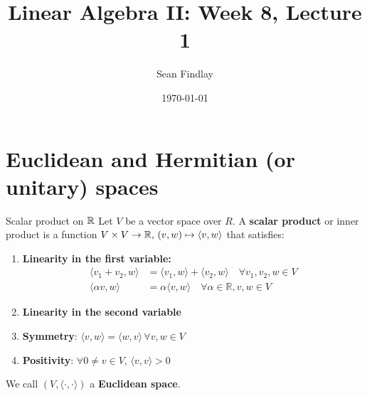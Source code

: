 \documentclass[12pt]{article}
\title{Linear Algebra II: Week 8, Lecture 1}
\author{Sean Findlay}
\date{\today}
\begin{document}
\maketitle

\section{Euclidean and Hermitian (or unitary) spaces}

\begin{definition}{Scalar product on $\mathbb{R}$}{}
Let $V$ be a vector space over $R$. A \textbf{scalar product} or inner product is a function $V \times V \rightarrow \mathbb{R}, \, (v, w) \mapsto \langle v, w \rangle$ that satisfies:

\begin{enumerate}
    \item \textbf{Linearity in the first variable:}
    \begin{align*}
        \langle v_1 + v_2, w \rangle &= \langle v_1, w \rangle + \langle v_2, w \rangle \quad \forall v_1, v_2, w \in V \\
        \langle \alpha v, w \rangle &= \alpha \langle v, w \rangle \quad \forall \alpha \in \mathbb{R}, v, w \in V
    \end{align*}

    \item \textbf{Linearity in the second variable}
    \item \textbf{Symmetry}: $\langle v, w \rangle = \langle w, v \rangle \, \forall v, w \in V$
    \item \textbf{Positivity}: $\forall 0 \neq v \in V, \, \langle v, v \rangle > 0$
\end{enumerate}

We call $(V, \langle \cdot, \cdot \rangle)$ a \textbf{Euclidean space}.
\end{definition}
\end{document}
